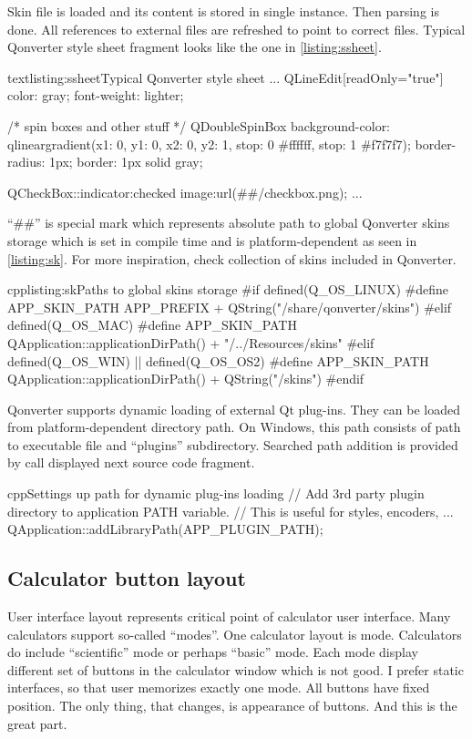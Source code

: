 Skin file is loaded and its content is stored in single instance. Then parsing is done. All references to external files are refreshed to point to correct files. Typical Qonverter style sheet fragment looks like the one in \autoref{listing:ssheet}.

\begin{fdoccode}{text}{listing:ssheet}{Typical Qonverter style sheet}
...
QLineEdit[readOnly="true"] {
    color: gray;
    font-weight: lighter;
}

/* spin boxes and other stuff */
QDoubleSpinBox {
    background-color: qlineargradient(x1: 0, y1: 0, x2: 0, y2: 1, stop: 0 #ffffff, stop: 1 #f7f7f7);
    border-radius: 1px;
	border: 1px solid gray;
}

QCheckBox::indicator:checked {
    image:url(##/checkbox.png);
}
...
\end{fdoccode}

\enquote{\#\#} is special mark which represents absolute path to global Qonverter skins storage which is set in compile time and is platform-dependent as seen in \autoref{listing:sk}. For more inspiration, check collection of skins included in Qonverter.

\begin{fdoccode}{cpp}{listing:sk}{Paths to global skins storage}
#if defined(Q_OS_LINUX)
#define	APP_SKIN_PATH APP_PREFIX + QString("/share/qonverter/skins")
#elif defined(Q_OS_MAC)
#define	APP_SKIN_PATH QApplication::applicationDirPath() + "/../Resources/skins"
#elif defined(Q_OS_WIN) || defined(Q_OS_OS2)
#define	APP_SKIN_PATH QApplication::applicationDirPath() + QString("/skins")
#endif
\end{fdoccode}

Qonverter supports dynamic loading of external Qt plug-ins. They can be loaded from platform-dependent directory path. On Windows, this path consists of path to executable file and \enquote{plugins} subdirectory. Searched path addition is provided by call displayed next source code fragment.
\begin{fdoccode}{cpp}{}{Settings up path for dynamic plug-ins loading}
// Add 3rd party plugin directory to application PATH variable.
// This is useful for styles, encoders, ...
QApplication::addLibraryPath(APP_PLUGIN_PATH);
\end{fdoccode}

\subsection{Calculator button layout}
User interface layout represents critical point of calculator user interface. Many calculators support so-called \enquote{modes}. One calculator layout is mode. Calculators do include \enquote{scientific} mode or perhaps \enquote{basic} mode. Each mode display different set of buttons in the calculator window which is not good. I prefer static interfaces, so that user memorizes exactly one mode. All buttons have fixed position. The only thing, that changes, is appearance of buttons. And this is the great part.

